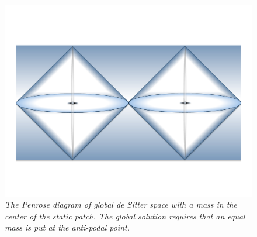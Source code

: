 \documentclass[a4paper,12pt]{article}
\makeatletter
\renewcommand\subsection{\@startsection{subsection}{2}{\z@}%
                                     {-3.25ex\@plus -1ex \@minus -.2ex}%
                                     {1.5ex \@plus .2ex}%
                                     {\normalfont\bfseries}}
\makeatother
\begin{document}








\begin{figure}[btp]
\begin{center}
\vspace{-1.4 cm}
\includegraphics[scale=0.44]{Global-dS.pdf}
\vspace{-1.6 cm}
\caption{\small \it The Penrose diagram of global de Sitter space with a mass in the center of the static patch. The global solution requires that an equal mass is put at the anti-podal point.}
\label{prenroseglobal}
\end{center}
\vspace{-0.2 cm}
\end{figure}
\end{document}
